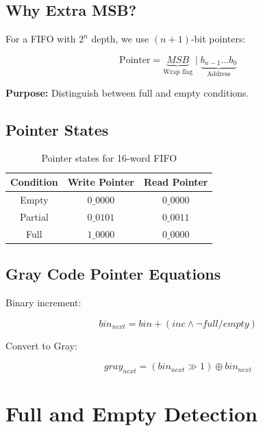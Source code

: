 \documentclass[12pt,a4paper]{article}
\begin{document}
\subsection{Why Extra MSB?}

For a FIFO with $2^n$ depth, we use $(n+1)$-bit pointers:

\begin{equation}
\text{Pointer} = \underbrace{MSB}_{\text{Wrap flag}} \mid \underbrace{b_{n-1} \ldots b_0}_{\text{Address}}
\end{equation}

\textbf{Purpose:} Distinguish between full and empty conditions.

\subsection{Pointer States}

\begin{table}[h]
\centering
\begin{tabular}{|c|c|c|}
\hline
\textbf{Condition} & \textbf{Write Pointer} & \textbf{Read Pointer} \\
\hline
Empty & $0\_0000$ & $0\_0000$ \\
Partial & $0\_0101$ & $0\_0011$ \\
Full & $1\_0000$ & $0\_0000$ \\
\hline
\end{tabular}
\caption{Pointer states for 16-word FIFO}
\end{table}

\subsection{Gray Code Pointer Equations}

Binary increment:

\begin{equation}
bin_{next} = bin + (inc \land \neg full/empty)
\end{equation}

Convert to Gray:

\begin{equation}
gray_{next} = (bin_{next} \gg 1) \oplus bin_{next}
\end{equation}

\section{Full and Empty Detection}
\end{document}
